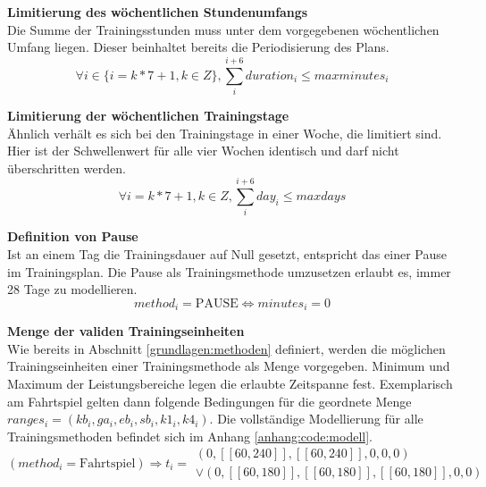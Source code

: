 \textbf{Limitierung des wöchentlichen Stundenumfangs} \\[0.2em]
Die Summe der Trainingsstunden muss unter dem vorgegebenen wöchentlichen Umfang liegen. Dieser beinhaltet bereits die Periodisierung des Plans.
\begin{equation}
    \forall i \in \{ i = k * 7 + 1, k \in Z \}, \sum_{i}^{i+6} duration_i \leq maxminutes_i
\end{equation}

\textbf{Limitierung der wöchentlichen Trainingstage} \\[0.2em]
Ähnlich verhält es sich bei den Trainingstage in einer Woche, die limitiert sind. Hier ist der Schwellenwert für alle vier Wochen identisch und darf nicht überschritten werden.
\begin{equation}
    \forall i = k * 7 + 1, k \in Z, \sum_{i}^{i+6} day_i \leq maxdays
\end{equation}

\textbf{Definition von Pause} \\[0.2em]
Ist an einem Tag die Trainingsdauer auf Null gesetzt, entspricht das einer Pause im Trainingsplan. Die Pause als Trainingsmethode umzusetzen erlaubt es, immer 28 Tage zu modellieren.
\begin{equation}
    method_i = \text{PAUSE} \Leftrightarrow minutes_i = 0
\end{equation}

\textbf{Menge der validen Trainingseinheiten} \\[0.2em]
Wie bereits in Abschnitt \ref{grundlagen:methoden} definiert, werden die möglichen Trainingseinheiten einer Trainingsmethode als Menge vorgegeben. Minimum und Maximum der Leistungsbereiche legen die erlaubte Zeitspanne fest. Exemplarisch am Fahrtspiel gelten dann folgende Bedingungen für die geordnete Menge $ranges_i = (kb_i, ga_i, eb_i, sb_i, k1_i, k4_i)$. Die vollständige Modellierung für alle Trainingsmethoden befindet sich im Anhang \ref{anhang:code:modell}.
\begin{equation}
    (method_i = \text{Fahrtspiel})\Rightarrow t_i = \begin{array}{c}
            (0, [\![60, 240]\!], [\![60, 240]\!], 0, 0, 0) \\ 
        \vee (0, [\![60,180]\!], [\![60, 180]\!], [\![60, 180]\!], 0, 0)
    \end{array}
\end{equation}


